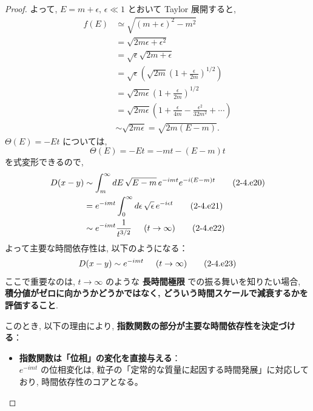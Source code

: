 \documentclass[a4paper,12pt]{article}
\begin{document}
\begin{proof}
よって, $E = m + \epsilon,\, \epsilon \ll 1$ とおいて Taylor 展開すると,
\begin{align*}
  f(E) &\simeq \sqrt{(m + \epsilon)^2 - m^2} \tag{2-4.e12}\\
  &= \sqrt{2m\epsilon + \epsilon^2} \tag{2-4.e13}\\
  &= \sqrt{\epsilon} \sqrt{2m + \epsilon} \tag{2-4.e14}\\
  &= \sqrt{\epsilon} \left( \sqrt{2m} \left( 1 + \frac{\epsilon}{2m} \right)^{1/2} \right) \tag{2-4.e15}\\
  &= \sqrt{2m\epsilon} \left( 1 + \frac{\epsilon}{2m} \right)^{1/2} \tag{2-4.e16}\\
  &= \sqrt{2m\epsilon} \left( 1 + \frac{\epsilon}{4m} - \frac{\epsilon^2}{32m^2} + \cdots \right) \tag{2-4.e17}\\
  &\sim \sqrt{2m\epsilon} = \sqrt{2m(E - m)}. \tag{2-4.e18}
\end{align*}
$\Theta(E) = -E t$ については,
\begin{equation*}
  \Theta(E) = -E t = -mt - (E - m)t \tag{2-4.e19}
\end{equation*}
を式変形できるので,
\begin{align*}
  D(x-y) &\sim \int_{m}^{\infty} dE\, \sqrt{E - m}\, e^{-imt} e^{-i(E - m)t} \tag{2-4.e20}\\
  &= e^{-imt} \int_{0}^{\infty} d\epsilon\, \sqrt{\epsilon}\,  e^{-i\epsilon t} \label{2-4.e21}\tag{2-4.e21}\\
  &\sim e^{-imt} \frac{1}{t^{3/2}} \hspace{0.5cm} (t \to \infty) \label{2-4.e22}\tag{2-4.e22}
\end{align*}
よって主要な時間依存性は, 以下のようになる：
\begin{equation*}
  D(x-y) \sim e^{-imt} \hspace{0.5cm} (t \to \infty) \tag{2-4.e23}
\end{equation*}
ここで重要なのは, $t \to \infty$ のような \textbf{長時間極限} での振る舞いを知りたい場合, \textbf{積分値がゼロに向かうかどうかではなく, どういう時間スケールで減衰するかを評価すること}.

このとき, 以下の理由により, \textbf{指数関数の部分が主要な時間依存性を決定づける}：

\begin{itemize}
  \item \textbf{指数関数は「位相」の変化を直接与える}：\\
  $e^{-imt}$ の位相変化は, 粒子の「定常的な質量に起因する時間発展」に対応しており, 時間依存性のコアとなる。


\end{itemize}
\end{proof}
\end{document}
